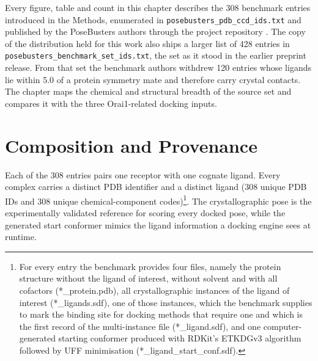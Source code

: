 Every figure, table and count in this chapter describes the 308 benchmark entries introduced in the Methods, enumerated in \texttt{posebusters\_pdb\_ccd\_ids.txt} and published by the PoseBusters authors through the project repository \cite{ref035}. The copy of the distribution held for this work also ships a larger list of 428 entries in \texttt{posebusters\_benchmark\_set\_ids.txt}, the set as it stood in the earlier preprint release. From that set the benchmark authors withdrew 120 entries whose ligands lie within 5.0\angstrom{} of a protein symmetry mate and therefore carry crystal contacts. The chapter maps the chemical and structural breadth of the source set and compares it with the three Orai1-related docking inputs.

\hypertarget{composition-and-provenance}{%
\section{Composition and Provenance}\label{composition-and-provenance}}

Each of the 308 entries pairs one receptor with one cognate ligand. Every complex carries a distinct PDB identifier and a distinct ligand (308 unique PDB IDs and 308 unique chemical-component codes)\footnote{For every entry the benchmark provides four files, namely the protein structure without the ligand of interest, without solvent and with all cofactors (*\_protein.pdb), all crystallographic instances of the ligand of interest (*\_ligands.sdf), one of those instances, which the benchmark supplies to mark the binding site for docking methods that require one and which is the first record of the multi-instance file (*\_ligand.sdf), and one computer-generated starting conformer produced with RDKit's ETKDGv3 algorithm followed by UFF minimisation (*\_ligand\_start\_conf.sdf).}. The crystallographic pose is the experimentally validated reference for scoring every docked pose, while the generated start conformer mimics the ligand information a docking engine sees at runtime.

